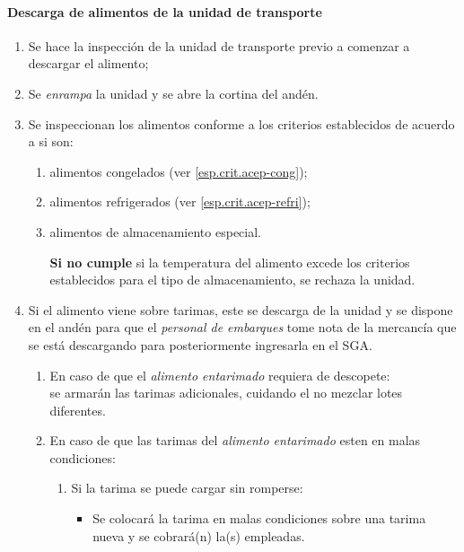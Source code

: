 \paragraph{Descarga de alimentos de la unidad de transporte}\label{sec:DescargaAlimentos}

\begin{enumerate}
    \item Se hace la inspección de la unidad de transporte previo a comenzar a descargar el alimento;
    \item Se \emph{enrampa} la unidad y se abre la cortina del andén.
    \item Se inspeccionan los alimentos conforme a los criterios establecidos de acuerdo a si son:
        \begin{enumerate}
            \item alimentos congelados (ver \cref{esp.crit.acep-cong});
            \item alimentos refrigerados (ver \cref{esp.crit.acep-refri});
            \item alimentos de almacenamiento especial.
        \end{enumerate}
        \begin{itemize}
            \item[\textbf{Si no cumple}] si la temperatura del alimento excede los criterios establecidos para el tipo de almacenamiento, se rechaza la unidad.
        \end{itemize}
    \item Si el alimento viene sobre tarimas, este se descarga de la unidad y se dispone en el andén para que el \emph{personal de embarques} tome nota de la mercancía que se está descargando para posteriormente ingresarla en el \gls{SGA}.
    \begin{enumerate}
        \item En caso de que el \emph{alimento entarimado} requiera de descopete:\\
        se armarán las tarimas adicionales, cuidando el no mezclar lotes diferentes.
        \item En caso de que las tarimas del \emph{alimento entarimado} esten en malas condiciones:\\
        \begin{enumerate}
            \item Si la tarima se puede cargar sin romperse:
                \begin{itemize}
                    \item Se colocará la tarima en malas condiciones sobre una tarima nueva y se cobrará(n) la(s) empleadas.

\end{itemize}
\end{enumerate}
\end{enumerate}
\end{enumerate}
